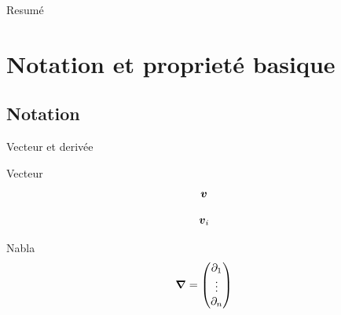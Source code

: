 \date[\today] %
{\today}

\subject{Navier-Stokes}





\setlength{\belowdisplayskip}{0pt}%
\setlength{\abovedisplayskip}{0pt}%
\begin{frame}
  \titlepage
\end{frame}

\begin{frame}[shrink]{Resumé}
  \tableofcontents[pausesections]
\end{frame}

\section{Notation et proprieté basique}
\subsection{Notation}
\begin{frame}{Vecteur et derivée}
 
 \begin{block}{Vecteur}
  \begin{equation*}
   {\boldsymbol {v}}
  \end{equation*}

  \begin{equation*}
   {\boldsymbol {v}}_{i}
  \end{equation*}

 \end{block}

\begin{block}{Nabla}
 \begin{equation*}
  {\boldsymbol {\nabla}}=\begin{pmatrix}
                 \partial_1\\
                 \vdots \\
                 \partial_n
                \end{pmatrix}
 \end{equation*}
\end{block}
\end{frame}


